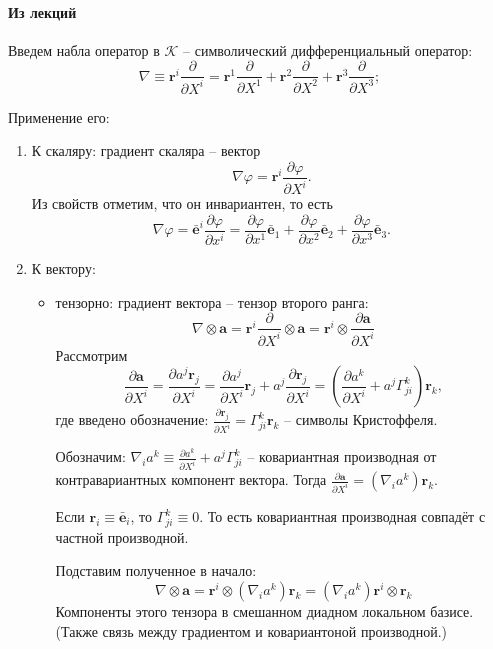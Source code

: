\paragraph{Из лекций}

Введем набла оператор в $\mathcal{K}$ -- символический дифференциальный оператор:
\[
\nabla \equiv \mathbf{r}^i \frac{\partial }{\partial X^i} 
= \mathbf{r}^1 \frac{\partial }{\partial X^1} + \mathbf{r}^2 \frac{\partial }{\partial X^2} 
+ \mathbf{r}^3 \frac{\partial }{\partial X^3};
\]

Применение его:
\begin{enumerate}
	\item К скаляру: градиент скаляра -- вектор
	\[
	\nabla \varphi = \mathbf{r}^i \frac{\partial \varphi}{\partial X^i}.
	\]
	Из свойств отметим, что он инвариантен, то есть 
	\[
	\nabla \varphi = \bar{\mathbf{e}}^i \frac{\partial \varphi}{\partial x^i} 
	= \frac{\partial \varphi}{\partial x^1} \bar{\mathbf{e}}_1 + \frac{\partial \varphi}{\partial x^2} \bar{\mathbf{e}}_2 + \frac{\partial \varphi}{\partial x^3} \bar{\mathbf{e}}_3.
	\]
	
	\item К вектору:
	\begin{itemize}
		\item тензорно: градиент вектора -- тензор второго ранга:
		\[
		\nabla \otimes \mathbf{a}
		= \mathbf{r}^i \frac{\partial }{\partial X^i} \otimes \mathbf{a}
		= \mathbf{r}^i \otimes \frac{\partial \mathbf{a}}{\partial X^i} 
		\]
		Рассмотрим
		\[
		\frac{\partial \mathbf{a}}{\partial X^i} 
		= \frac{\partial a^j \mathbf{r}_j}{\partial X^i} 
		= \frac{\partial a^j}{\partial X^i} \mathbf{r}_j
		+ a^j \frac{\partial \mathbf{r}_j}{\partial X^i} 
		= \left( \frac{\partial a^k}{\partial X^i} + a^j \Gamma^k_{ji} \right) \mathbf{r}_k,
		\]
		где введено обозначение:
		$ \frac{\partial \mathbf{r}_j}{\partial X^i} 
		= \Gamma^k_{ji} \mathbf{r}_k $
		-- символы Кристоффеля.
		
		Обозначим: $\nabla_i a^k \equiv \frac{\partial a^k}{\partial X^i} + a^j \Gamma^k_{ji}$
		-- ковариантная производная от контравариантных компонент вектора.
		Тогда $ \frac{\partial \mathbf{a}}{\partial X^i} = (\nabla_i a^k) \mathbf{r}_k$.
		
		Если $\mathbf{r}_i \equiv \bar{\mathbf{e}}_i$, то $\Gamma^k_{ji} \equiv 0$. То есть
		ковариантная производная совпадёт с частной производной.
		
		Подставим полученное в начало:
		\[
		\nabla \otimes \mathbf{a} = \mathbf{r}^i \otimes (\nabla_i a^k) \mathbf{r}_k 
		= (\nabla_i a^k) \mathbf{r}^i \otimes \mathbf{r}_k
		\]
		Компоненты этого тензора в смешанном диадном локальном базисе. (Также связь между градиентом и ковариантоной производной.)
		

\end{itemize}
\end{enumerate}
